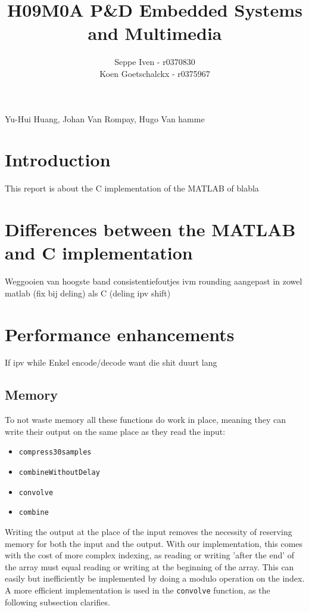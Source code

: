 \documentclass[a4paper]{article}
\title{H09M0A P\&D Embedded Systems and Multimedia}
\author{Seppe Iven - r0370830 \\ Koen Goetschalckx - r0375967}
\begin{document}
 
\maketitle
\begin{center} Yu-Hui Huang, Johan Van Rompay, Hugo Van hamme
\end{center}

\section{Introduction}
This report is about the C implementation of the MATLAB of blabla

\section{Differences between the MATLAB and C implementation}
Weggooien van hoogste band
consistentiefoutjes ivm rounding aangepast in zowel matlab (fix bij deling) als C (deling ipv shift)
\section{Performance enhancements}
If ipv while
Enkel encode/decode want die shit duurt lang
\subsection{Memory}
To not waste memory all these functions do work in place, meaning they can write their output on the same place as they read the input:
\begin{itemize}[noitemsep]
\item \texttt{compress30samples}
\item \texttt{combineWithoutDelay}
\item \texttt{convolve}
\item \texttt{combine}
\end{itemize}
Writing the output at the place of the input removes the necessity of reserving memory for both the input and the output. With our implementation, this comes with the cost of more complex indexing, as reading or writing 'after the end' of the array must equal reading or writing at the beginning of the array. This can easily but inefficiently be implemented by doing a modulo operation on the index. A more efficient implementation is used in the \texttt{convolve} function, as the following subsection clarifies.
\end{document}
